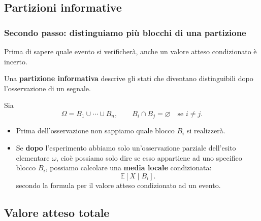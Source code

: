 \documentclass[handout]{beamer}%
\newenvironment{stepitemize}{\begin{itemize}[<+->]}{\end{itemize} }
\providecommand{\E}{\mathbb{E}}
\providecommand{\1}{\mathbf{1}}
\providecommand{\QTR}[2]{\csname #1\endcsname{#2}}
\begin{document}


\subsection{Partizioni informative}%

\begin{frame}%
%

\frametitle{Secondo passo: distinguiamo pi\`{u} blocchi di una partizione}%
%

%


\textcolor{light-blue}{Prima di sapere quale
evento si verificher\`{a}, anche  un valore atteso condizionato è incerto.}

\medskip

Una \textbf{partizione informativa} descrive gli stati che diventano
distinguibili dopo l'osservazione di un segnale.

\medskip

Sia
\[
\Omega= B_{1}\cup\cdots\cup B_{n}, \qquad B_{i}\cap B_{j}=\varnothing
\quad\text{se } i\neq j.
\]


\begin{stepitemize}
\item Prima dell'osservazione non sappiamo quale blocco $B_{i}$ si realizzer\`{a}.

\item Se \textbf{dopo} l'esperimento abbiamo solo un'osservazione parziale
dell'esito elementare $\omega$, cio\`{e} possiamo solo dire se esso appartiene
ad uno specifico blocco $B_{i}$, possiamo calcolare una \textbf{media locale}
condizionata:
\[
\E[X\mid B_i].
\]
secondo la formula per il valore atteso condizionato ad un evento.
\end{stepitemize}%

\transboxout
\end{frame}%


\subsection{Valore atteso totale}%
\end{document}
